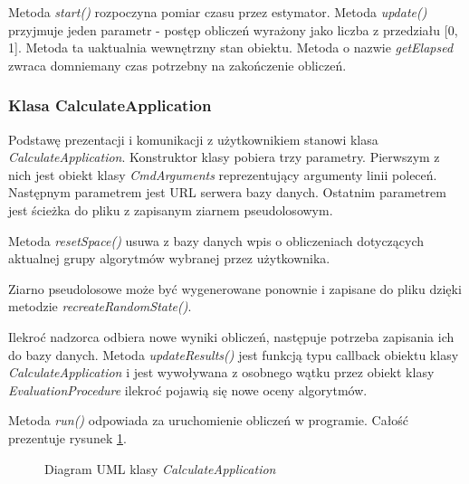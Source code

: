 \documentclass[../thesis.tex]{subfiles}
\begin{document}
Metoda \emph{start()} rozpoczyna pomiar czasu przez estymator. Metoda \emph{update()} przyjmuje jeden parametr - postęp obliczeń wyrażony jako liczba z przedziału [0, 1]. Metoda ta uaktualnia wewnętrzny stan obiektu. Metoda o nazwie \emph{getElapsed} zwraca domniemany czas potrzebny na zakończenie obliczeń.

\subsubsection{Klasa CalculateApplication}

Podstawę prezentacji i komunikacji z użytkownikiem stanowi klasa \emph{CalculateApplication}. Konstruktor klasy pobiera trzy parametry. Pierwszym z nich jest obiekt klasy \emph{CmdArguments} reprezentujący argumenty linii poleceń. Następnym parametrem jest URL serwera bazy danych. Ostatnim parametrem jest ścieżka do pliku z zapisanym ziarnem pseudolosowym.

Metoda \emph{resetSpace()} usuwa z bazy danych wpis o obliczeniach dotyczących aktualnej grupy algorytmów wybranej przez użytkownika. 

Ziarno pseudolosowe może być wygenerowane ponownie i zapisane do pliku dzięki metodzie \emph{recreateRandomState()}.

Ilekroć nadzorca odbiera nowe wyniki obliczeń, następuje potrzeba zapisania ich do bazy danych. Metoda \emph{updateResults()} jest funkcją typu callback obiektu klasy \emph{CalculateApplication} i jest wywoływana z osobnego wątku przez obiekt klasy \emph{EvaluationProcedure} ilekroć pojawią się nowe oceny algorytmów.

Metoda \emph{run()} odpowiada za uruchomienie obliczeń w programie. Całość prezentuje rysunek \ref{proj:diagram_calculate_application}.

\begin{figure}[h]
\centering
{}
\caption{Diagram UML klasy \emph{CalculateApplication}}
\label{proj:diagram_calculate_application}
\end{figure}
\end{document}
